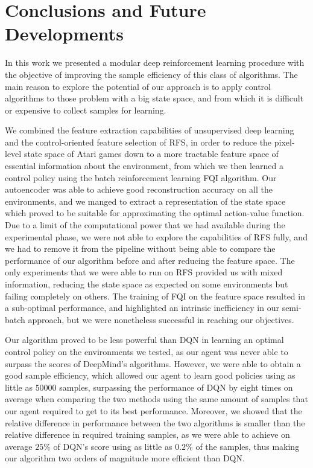 \chapter{Conclusions and Future Developments}
\label{chapter7_conclusions}
\thispagestyle{empty}

\vspace{0.5cm}

In this work we presented a modular deep reinforcement learning procedure 
with the objective of improving the sample efficiency of this class of 
algorithms.
The main reason to explore the potential of our approach is to apply control
algorithms to those problem with a big state space, and from which it is 
difficult or expensive to collect samples for learning. 

We combined the feature extraction capabilities of unsupervised deep learning 
and the control-oriented feature selection of RFS, in order to reduce the 
pixel-level state space of Atari games down to a more tractable feature space of 
essential information about the environment, from which we then learned a 
control policy using the batch reinforcement learning FQI algorithm.
Our autoencoder was able to achieve good reconstruction accuracy on all the
environments, and we manged to extract a representation of the state space
which proved to be suitable for approximating the optimal action-value function.
Due to a limit of the computational power that we had available during the 
experimental phase, we were not able to explore the capabilities of RFS fully, 
and we had to remove it from the pipeline without being able to compare the 
performance of our algorithm before and after reducing the feature space. 
The only experiments that we were able to run on RFS provided us with mixed
information, reducing the state space as expected on some environments but 
failing completely on others. 
The training of FQI on the feature space resulted in a sub-optimal
performance, and highlighted an intrinsic inefficiency in our semi-batch 
approach, but we were nonetheless successful in reaching our objectives.

Our algorithm proved to be less powerful than DQN in learning an optimal control
policy on the environments we tested, as our agent was never able to surpass the
scores of DeepMind's algorithms.
However, we were able to obtain a good sample efficiency, which allowed our 
agent to learn good policies using as little as $50000$ samples, surpassing the 
performance of DQN by eight times on average when comparing the two methods 
using the same amount of samples that our agent required to get to its best 
performance.
Moreover, we showed that the relative difference in performance between the 
two algorithms is smaller than the relative difference in required training 
samples, as we were able to achieve on average $25\%$ of DQN's score using as 
little as $0.2\%$ of the samples, thus making our algorithm two orders of 
magnitude more efficient than DQN.

